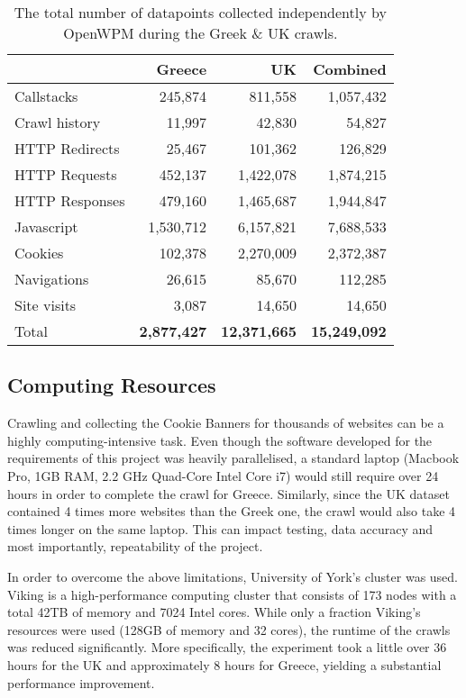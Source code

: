 \documentclass[../main.tex]{subfiles}
\begin{document}
\begin{table}[ht]
    \centering
    \begin{tabular}{@{}lrrr@{}}
        \toprule
                       & Greece             & UK         & Combined        \\ \midrule
        Callstacks     & 245,874            & 811,558    & 1,057,432    \\
        Crawl history  & 11,997             & 42,830     & 54,827       \\
        HTTP Redirects & 25,467             & 101,362    & 126,829      \\
        HTTP Requests  & 452,137            & 1,422,078  & 1,874,215    \\
        HTTP Responses & 479,160            & 1,465,687  & 1,944,847    \\
        Javascript     & 1,530,712          & 6,157,821  & 7,688,533    \\
        Cookies        & 102,378            & 2,270,009  & 2,372,387    \\
        Navigations    & 26,615             & 85,670     & 112,285      \\
        Site visits    & 3,087              & 14,650     & 14,650       \\
        Total          & \textbf{2,877,427} & \textbf{12,371,665} & \textbf{15,249,092} \\ \bottomrule
    \end{tabular}
    \caption{The total number of datapoints collected independently by OpenWPM during the Greek \& UK crawls.}
    \label{tab:data_open_wpm}
\end{table}

\newpage
\subsection{Computing Resources}
Crawling and collecting the Cookie Banners for thousands of websites can be a highly computing-intensive task. Even though the software developed for the requirements of this project was heavily parallelised, a standard laptop (Macbook Pro, 1GB RAM, 2.2 GHz Quad-Core Intel Core i7) would still require over 24 hours in order to complete the crawl for Greece. Similarly, since the UK dataset contained 4 times more websites than the Greek one, the crawl would also take 4 times longer on the same laptop. This can impact testing, data accuracy and most importantly, repeatability of the project. 

In order to overcome the above limitations, University of York’s  \cite{viking} cluster was used. Viking is a high-performance computing cluster that consists of 173 nodes with a total 42TB of memory and 7024 Intel cores. While only a fraction Viking’s resources were used (128GB of memory and 32 cores), the runtime of the crawls was reduced significantly. More specifically, the experiment took a little over 36 hours for the UK and approximately 8 hours for Greece, yielding a substantial performance improvement.
\end{document}
